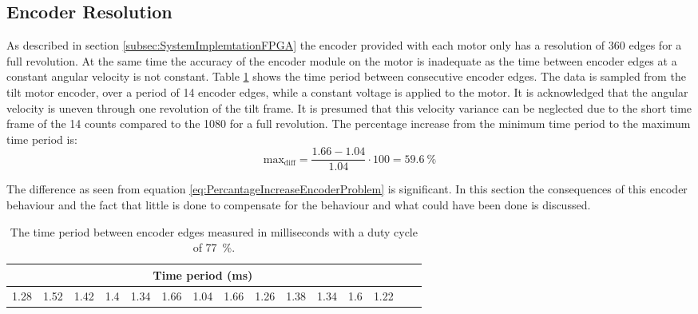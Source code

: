 \documentclass[../../main.tex]{subfiles}
\begin{document}



\subsection{Encoder Resolution}
As described in section \ref{subsec:SystemImplemtationFPGA} the encoder provided with each motor only has a resolution of 360 edges for a full revolution. At the same time the accuracy of the encoder module on the motor is inadequate as the time between encoder edges at a constant angular velocity is not constant. Table \ref{tab:EncoderDifferenceBetweenEdges} shows the time period between consecutive encoder edges. The data is sampled from the tilt motor encoder, over a period of 14 encoder edges, while a constant voltage is applied to the motor. It is acknowledged that the angular velocity is uneven through one revolution of the tilt frame. It is presumed that this velocity variance can be neglected due to the short time frame of the 14 counts compared to the 1080 for a full revolution. 
The percentage increase from the minimum time period to the maximum time period is:
\begin{equation} \label{eq:PercantageIncreaseEncoderProblem}
    \mathrm{max_{diff}} = \frac{1.66 - 1.04}{1.04} \cdot 100 = \SI{59.6}{\percent} 
\end{equation}

The difference as seen from equation \ref{eq:PercantageIncreaseEncoderProblem} is significant. In this section the consequences of this encoder behaviour and the fact that little is done to compensate for the behaviour and what could have been done is discussed.

\begin{table}[H]
    \centering
    \begin{tabular}{c c c c c c c c c c c c c c c}
         \multicolumn{13}{c}{Time period (ms)} \\ \hline
         
         1.28 &
         1.52 &
         1.42 &
         1.4  &
         1.34 &
         1.66 &
         1.04 &
         1.66 &
         1.26 &
         1.38 &
         1.34 &
         1.6  &
         1.22 
       
    \end{tabular}
    \caption{The time period between encoder edges measured in milliseconds with a duty cycle of \SI{77}{\percent}.}
    \label{tab:EncoderDifferenceBetweenEdges}
\end{table}
\end{document}
